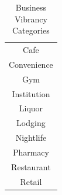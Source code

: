 \documentclass{article}
\begin{document}
\begin{enumerate}
\begin{table}[h]
  \begin{center}
    \caption{Business Vibrancy Categories}
    \label{tab:bus_vib_cat}
    \begin{tabular}{c}
      \toprule %
      Cafe\\
      Convenience\\
      Gym\\
      Institution\\
      Liquor\\
      Lodging\\
      Nightlife\\
      Pharmacy\\
      Restaurant\\
      Retail\\
      \bottomrule %
    \end{tabular}
  \end{center}
\end{table}
\end{enumerate}
\end{document}
